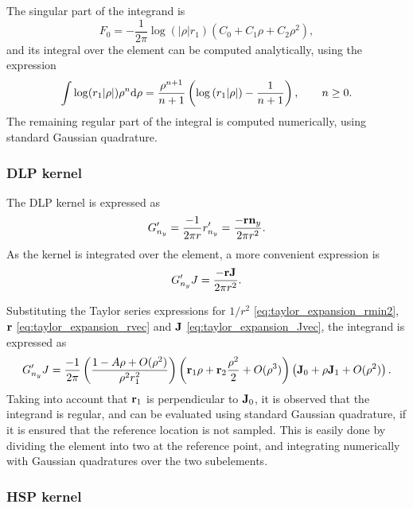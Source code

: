 The singular part of the integrand is
%
\begin{equation}
	F_0 = -\frac{1}{2\pi} \log \left(|\rho| r_1\right) \left( C_0 + C_1 \rho + C_2 \rho^2 \right)
	,
\end{equation}
%
and its integral over the element can be computed analytically, using the expression
%
\begin{equation}
	\int \log(r_1 |\rho|) \rho^n \mathrm{d} \rho = \frac{\rho^{n+1}}{n+1} \left( \log\left(r_1 |\rho|\right) - \frac{1}{n+1} \right)
	, \qquad n \ge 0
	.
\end{equation}
%
The remaining regular part of the integral is computed numerically, using standard Gaussian quadrature.


\subsubsection{DLP kernel}

The DLP kernel is expressed as
%
\begin{equation}
	G'_{n_y} = \frac{-1}{2\pi r} r'_{n_y}
	= \frac{-{\bf r} {\bf n}_y}{2\pi r^2} 
	.
\end{equation}
%
As the kernel is integrated over the element, a more convenient expression is
%
\begin{equation}
	G'_{n_y} J = \frac{-{\bf r} {\bf J}}{2\pi r^2} 
	.
\end{equation}

Substituting the Taylor series expressions for $1/r^2$ \eqref{eq:taylor_expansion_rmin2}, ${\bf r}$ \eqref{eq:taylor_expansion_rvec} and ${\bf J}$ \eqref{eq:taylor_expansion_Jvec}, the integrand is expressed as
%
\begin{equation}
	G'_{n_y} J = \frac{-1}{2\pi} \left(\frac{1-A\rho + O(\rho^2)}{\rho^2 r_1^2}\right) 
	\left( {\bf r}_1 \rho + {\bf r}_2 \frac{\rho^2}{2} + O(\rho^3) \right) 
	\left( {\bf J}_0 + \rho {\bf J}_1 + O(\rho^2) \right)
	.
\end{equation}
%
Taking into account that ${\bf r}_1$ is perpendicular to ${\bf J}_0$, it is observed that the integrand is regular, and can be evaluated using standard Gaussian quadrature, if it is ensured that the reference location is not sampled.
This is easily done by dividing the element into two at the reference point, and integrating numerically with Gaussian quadratures over the two subelements.


\subsubsection{HSP kernel}

